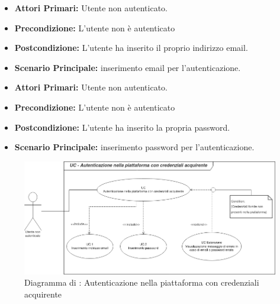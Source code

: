 \resetSubUC
{}
\begin{itemize}
	\item \textbf{Attori Primari:} Utente non autenticato.
	\item \textbf{Precondizione:} L'utente non è autenticato
	\item \textbf{Postcondizione:} L'utente ha inserito il proprio indirizzo email.
	\item \textbf{Scenario Principale:} inserimento email per l'autenticazione.
\end{itemize}

\begin{itemize}
	\item \textbf{Attori Primari:} Utente non autenticato.
	\item \textbf{Precondizione:} L'utente non è autenticato
	\item \textbf{Postcondizione:} L'utente ha inserito la propria password.
	\item \textbf{Scenario Principale:} inserimento password per l'autenticazione.
\end{itemize}


\begin{figure}[H]
	\centering
	\includegraphics[scale=0.6]{Immagini/DiagrammiUC/AccessoAcquirente.png}
	\caption{Diagramma di \actualUC: Autenticazione nella piattaforma con credenziali acquirente} 
	\label{fig:Login}
\end{figure}

